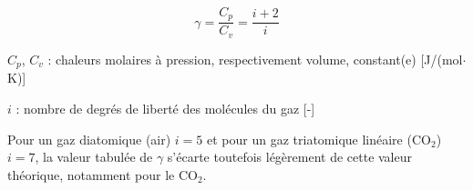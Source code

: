 \begin{equation}
  \gamma = \frac{C_p}{C_v} = \frac{i + 2}{i}
  \label{eq:facteur-adiabatique}
\end{equation}
\begin{legendevar}
  \item $C_p$, $C_v$ : chaleurs molaires à pression, respectivement volume, constant(e) [J/(mol$\cdot$K)]
  \item $i$ : nombre de degrés de liberté des molécules du gaz [-]
\end{legendevar}

Pour un gaz diatomique (air) $i = 5$ et pour un gaz triatomique linéaire (CO$_2$) $i = 7$, la valeur tabulée de $\gamma$ s'écarte toutefois légèrement de cette valeur théorique, notamment pour le CO$_2$.
